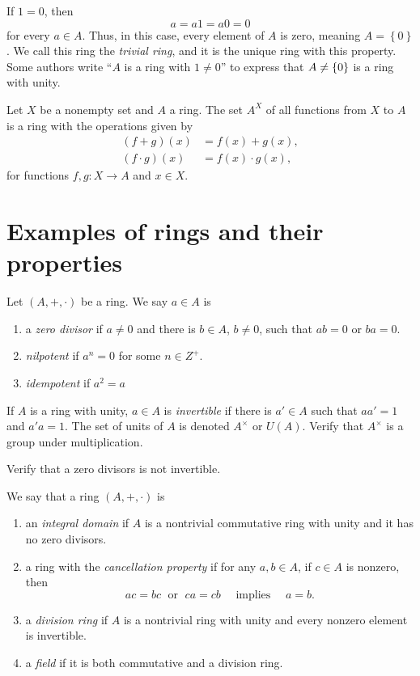 \documentclass[11pt,a4paper]{article}
\begin{document}
\begin{rem}
    If \(1 = 0\), then \[a = a 1 = a 0 = 0\] for every \(a\in A\).
    Thus, in this case, every element of \(A\) is zero, meaning \(A = \left\{ 0 \right\}\).
    We call this ring the \textit{trivial ring}, and it is the unique ring with this property.
    Some authors write ``$A$ is a ring with $1\neq 0$'' to express that $A\neq \left\lbrace 0 \right\rbrace$ is a ring with unity.
\end{rem}

\begin{exa}
Let \(X\) be a nonempty set and \(A\) a ring. 
The set \(A^X\) of all functions from \(X\) to  $A$ is  a ring with the operations given by
\begin{align*}
(f+g)(x) &= f(x)+g(x), \\
(f\cdot g)(x) &= f(x)\cdot g(x), 
\end{align*}
for functions \(f,g\colon X\to A\) and \(x\in X\). 
\end{exa}



\section{Examples of rings and their properties}

Let $(A,+,\cdot)$ be a ring. We say \(a\in A\) is 

\begin{enumerate}[label=(\roman*)]
\item a \textit{zero divisor} if \(a\neq 0\) and there is \(b \in A\), \(b\neq 0\), such that \(ab = 0\) or \(ba=0\).
\item \textit{nilpotent}  if \(a^n = 0\) for some \(n\in Z^+\).
\item \textit{idempotent} if \(a^2 = a\)
\end{enumerate}

If \(A\) is a ring with unity, \(a\in A\) is \textit{invertible} if there is \(a'\in A\) such that \(aa' = 1\) and \(a'a=1\).
The set of units of \(A\) is denoted \(A^\times \) or \(U(A)\). Verify that \(A^\times\) is a group under multiplication.

\begin{eje}
    Verify that a zero divisors is not invertible.
\end{eje}

We say that a ring $(A,+,\cdot)$
is 
\begin{enumerate}[label=(\roman*)]
\item an \textit{integral domain} if \(A\) is a nontrivial commutative ring with unity and it has no zero divisors.
\item a ring with the \textit{cancellation property} if for any \(a,b\in A\), if \(c\in A\) is nonzero, then 
\[
ac=bc \;\text{ or }\; ca = cb \quad\text{ implies }\quad a=b.
\]

\item a \textit{division ring} if \(A\) is a nontrivial ring with unity and every nonzero element is invertible.
\item a \textit{field} if it is both commutative and   a division ring. 
\end{enumerate}
\end{document}
